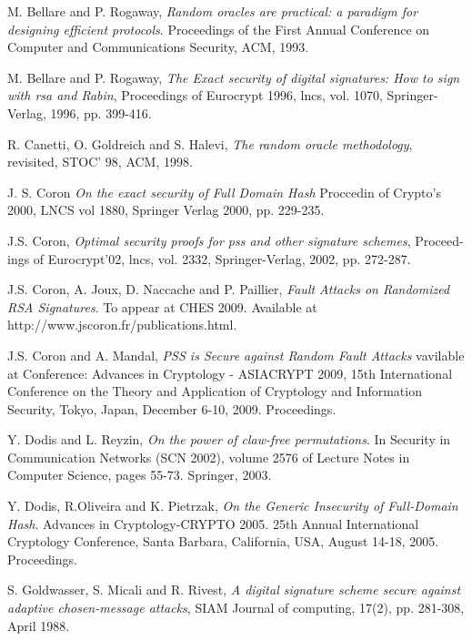 \documentclass[a4paper,11pt]{article}
\begin{document}
\begin{thebibliography}{10}

 M. Bellare and P. Rogaway, \emph{Random oracles are practical: a paradigm for designing
efficient protocols}. Proceedings of the First Annual Conference on Computer and Communications Security, ACM, 1993.

 M. Bellare and P. Rogaway, \emph{The Exact security of digital signatures: How to sign
with rsa and Rabin}, Proceedings of Eurocrypt 1996, lncs, vol. 1070, Springer-Verlag, 1996, pp. 399-416.

 R. Canetti, O. Goldreich and S. Halevi, \emph{The random oracle methodology}, revisited,
STOC' 98, ACM, 1998.

 J. S. Coron \emph{On the exact security of Full Domain Hash} Proccedin of Crypto's 2000, LNCS vol 1880,  Springer Verlag 2000, pp. 229-235.

 J.S. Coron,\emph{ Optimal security proofs for pss and other signature schemes}, Proceed-
ings of Eurocrypt'02, lncs, vol. 2332, Springer-Verlag, 2002, pp. 272-287.

 J.S. Coron, A. Joux, D. Naccache and P. Paillier, \emph{Fault Attacks on Randomized RSA Signatures}. To appear at CHES 2009. Available at http://www.jscoron.fr/publications.html.

 J.S. Coron and A. Mandal, \emph{PSS is Secure against Random Fault Attacks} vavilable at Conference: Advances in Cryptology - ASIACRYPT 2009, 15th International Conference on the Theory and Application of Cryptology and Information Security, Tokyo, Japan, December 6-10, 2009. Proceedings.

 Y. Dodis and L. Reyzin, \emph{On the power of claw-free permutations}. In Security in Communication Networks (SCN 2002), volume 2576 of Lecture Notes in Computer Science, pages 55-73. Springer, 2003.


 Y. Dodis,  R.Oliveira and K. Pietrzak, \emph{On the Generic Insecurity of Full-Domain Hash}. Advances in Cryptology-CRYPTO 2005. 25th Annual International Cryptology Conference, Santa Barbara, California, USA, August 14-18, 2005. Proceedings.

 S. Goldwasser, S. Micali and R. Rivest, \emph{A digital signature scheme secure against
adaptive chosen-message attacks}, SIAM Journal of computing, 17(2), pp. 281-308, April 1988.


\end{thebibliography}
\end{document}
